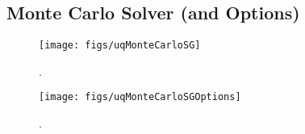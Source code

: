 \subsection{Monte Carlo Solver (and Options)}

\begin{figure}[h!]
\centerline{
\texttt{[image: figs/uqMonteCarloSG]}
}
\caption{
{\color{red}{The Monte Carlo sequence generator class}}.
}
\label{fig-monte-carlo-solver-class}
\end{figure}

\begin{figure}[h!]
\begin{center}
\texttt{[image: figs/uqMonteCarloSGOptions]}
\end{center}
\caption{
{\color{red}{The Monte Carlo sequence generator options class}}.
}
\label{fig-monte-carlo-options-class}
\end{figure}


